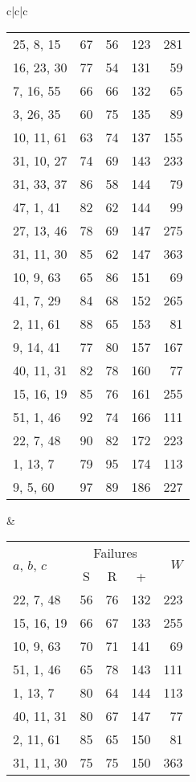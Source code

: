 \documentclass{acmsmalltr}
\newcommand{\xst}[3]{#1, #2, #3}
\begin{document}
\begin{sidewaystable}
{\begin{tabular}{c|c|c}
\begin{tabular}{l|rr|r|r}
\hline
\xst{25}{8}{15} & 67 & 56 & 123 & 281\\
\xst{16}{23}{30} & 77 & 54 & 131 & 59\\
\xst{7}{16}{55} & 66 & 66 & 132 & 65\\
\xst{3}{26}{35} & 60 & 75 & 135 & 89\\
\xst{10}{11}{61} & 63 & 74 & 137 & 155\\
\xst{31}{10}{27} & 74 & 69 & 143 & 233\\
\xst{31}{33}{37} & 86 & 58 & 144 & 79\\
\xst{47}{1}{41} & 82 & 62 & 144 & 99\\
\xst{27}{13}{46} & 78 & 69 & 147 & 275\\
\xst{31}{11}{30} & 85 & 62 & 147 & 363\\
\xst{10}{9}{63} & 65 & 86 & 151 & 69\\
\xst{41}{7}{29} & 84 & 68 & 152 & 265\\
\xst{2}{11}{61} & 88 & 65 & 153 & 81\\
\xst{9}{14}{41} & 77 & 80 & 157 & 167\\
\xst{40}{11}{31} & 82 & 78 & 160 & 77\\
\xst{15}{16}{19} & 85 & 76 & 161 & 255\\
\xst{51}{1}{46} & 92 & 74 & 166 & 111\\
\xst{22}{7}{48} & 90 & 82 & 172 & 223\\
\xst{1}{13}{7} & 79 & 95 & 174 & 113\\
\xst{9}{5}{60} & 97 & 89 & 186 & 227\\
\end{tabular}&
\begin{tabular}{l|rr|r|r}
\multirow{2}{*}{$a$, $b$, $c$} & \multicolumn{3}{c|}{Failures}  & \multirow{2}{*}{$W$}\\
& \multicolumn{1}{c}{S} & \multicolumn{1}{c|}{R} & \multicolumn{1}{c|}{+} \\
\hline
\xst{22}{7}{48} & 56 & 76 & 132 & 223\\
\xst{15}{16}{19} & 66 & 67 & 133 & 255\\
\xst{10}{9}{63} & 70 & 71 & 141 & 69\\
\xst{51}{1}{46} & 65 & 78 & 143 & 111\\
\xst{1}{13}{7} & 80 & 64 & 144 & 113\\
\xst{40}{11}{31} & 80 & 67 & 147 & 77\\
\xst{2}{11}{61} & 85 & 65 & 150 & 81\\
\xst{31}{11}{30} & 75 & 75 & 150 & 363\\

\end{tabular}
\end{tabular}}
\end{sidewaystable}
\end{document}
